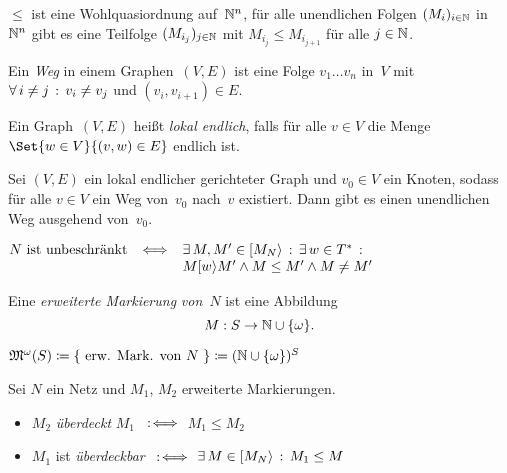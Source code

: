 \documentclass{cheat-sheet}
\newcommand{\activeTransition}[1]{[{#1}\rangle} %
\newcommand{\ExtMarkings}{\mathfrak{M}^\omega} %
\begin{document}
\begin{lem}
  $\leq$ ist eine Wohlquasiordnung auf~$\mathbb{N}^n$, \dh{} für alle unendlichen Folgen $(M_i)_{i \in \mathbb{N}}$ in~$\mathbb{N}^n$ gibt es eine Teilfolge $(M_{i_j})_{j \in \mathbb{N}}$ mit $M_{i_j} \leq M_{i_{j+1}}$ für alle $j \in \mathbb{N}$.
\end{lem}

\begin{defn}
  Ein \emph{Weg} in einem Graphen~$(V, E)$ ist eine Folge $v_1 \ldots v_n$ in~$V$ mit $\forall \, {i \neq j} \,:\, v_i \neq v_j$ und $(v_i, v_{i+1}) \in E$.
\end{defn}

\begin{defn}
  Ein Graph~$(V, E)$ heißt \emph{lokal endlich}, falls für alle $v \in V$ die Menge $\Set{w \in V}{(v, w) \in E}$ endlich ist.
\end{defn}

\begin{lem}
  Sei $(V, E)$ ein lokal endlicher gerichteter Graph und $v_0 \in V$ ein Knoten, sodass für alle $v \in V$ ein Weg von~$v_0$ nach~$v$ existiert. 
  Dann gibt es einen unendlichen Weg ausgehend von~$v_0$.
\end{lem}

\begin{satz}
  $
    N \text{ ist unbeschränkt} \enspace \iff
    \begin{array}[t]{l}
      \ex{M, M' \in \activeTransition{M_N}} \ex{w \in T^*} \\
      M \activeTransition{w} M' \wedge M \leq M' \wedge M \neq M'
    \end{array}
  $
\end{satz}

\begin{defn}
  Eine \emph{erweiterte Markierung} \textit{von~$N$} ist eine Abbildung
  \[
    M : S \to \mathbb{N} \cup \{ \omega \}.
  \]
\end{defn}

\begin{nota}
  $\ExtMarkings(S) \coloneqq \{ \text{ erw. Mark. von~$N$ } \} \coloneqq (\N \cup \{ \omega \})^S$
\end{nota}

\begin{defn}
  Sei $N$ ein Netz und $M_1$, $M_2$ erweiterte Markierungen.
  \begin{itemize}
    \item $M_2$ \emph{überdeckt} $M_1$ $\enspace:\!\iff$ $M_1 \leq M_2$
    \item $M_1$ ist \emph{überdeckbar} $\enspace:\!\iff$ $\ex{M \in \activeTransition{M_N}} M_1 \leq M$
  \end{itemize}
\end{defn}
\end{document}
